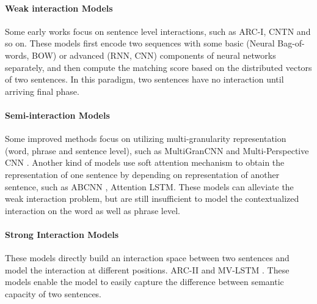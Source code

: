 \documentclass{article}
\begin{document}
\paragraph{Weak interaction Models}
Some early works focus on sentence level interactions, such as ARC-I\cite{hu2014convolutional}, CNTN\cite{qiu2015convolutional} and so on. These models first encode two sequences with some basic (Neural Bag-of-words, BOW) or advanced (RNN, CNN) components of neural networks separately, and then compute the matching score based on the distributed vectors of two sentences. In this paradigm, two sentences have no interaction until arriving final phase.
\vspace{-1em}
\paragraph{Semi-interaction Models}
Some improved methods focus on utilizing multi-granularity representation (word, phrase and sentence level), such as  MultiGranCNN \cite{yin2015convolutional} and Multi-Perspective CNN \cite{he2015multi}.
Another kind of models use soft attention mechanism to obtain the representation of one sentence by  depending on representation of another sentence, such as  ABCNN \cite{yin2015abcnn}, Attention LSTM\cite{rocktaschel2015reasoning,hermann2015teaching}.
These models can alleviate the weak interaction problem, but are still insufficient to model the contextualized interaction on the word as well as phrase level.
\vspace{-1em}
\paragraph{Strong Interaction Models}
These models directly build an interaction space between two sentences and model the interaction at different positions. ARC-II \cite{hu2014convolutional} and MV-LSTM \cite{wan2015deep}. These models enable the model to easily capture the difference between semantic capacity of two sentences.


\end{document}
